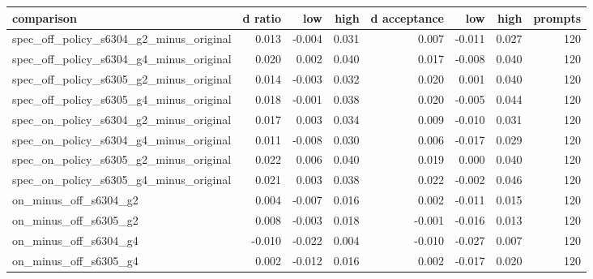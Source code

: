 \begin{tabular}{lrrrrrrr}
\toprule
comparison & d ratio & low & high & d acceptance & low & high & prompts \\
\midrule
spec\_off\_policy\_s6304\_g2\_minus\_original & 0.013 & -0.004 & 0.031 & 0.007 & -0.011 & 0.027 & 120 \\
spec\_off\_policy\_s6304\_g4\_minus\_original & 0.020 & 0.002 & 0.040 & 0.017 & -0.008 & 0.040 & 120 \\
spec\_off\_policy\_s6305\_g2\_minus\_original & 0.014 & -0.003 & 0.032 & 0.020 & 0.001 & 0.040 & 120 \\
spec\_off\_policy\_s6305\_g4\_minus\_original & 0.018 & -0.001 & 0.038 & 0.020 & -0.005 & 0.044 & 120 \\
spec\_on\_policy\_s6304\_g2\_minus\_original & 0.017 & 0.003 & 0.034 & 0.009 & -0.010 & 0.031 & 120 \\
spec\_on\_policy\_s6304\_g4\_minus\_original & 0.011 & -0.008 & 0.030 & 0.006 & -0.017 & 0.029 & 120 \\
spec\_on\_policy\_s6305\_g2\_minus\_original & 0.022 & 0.006 & 0.040 & 0.019 & 0.000 & 0.040 & 120 \\
spec\_on\_policy\_s6305\_g4\_minus\_original & 0.021 & 0.003 & 0.038 & 0.022 & -0.002 & 0.046 & 120 \\
on\_minus\_off\_s6304\_g2 & 0.004 & -0.007 & 0.016 & 0.002 & -0.011 & 0.015 & 120 \\
on\_minus\_off\_s6305\_g2 & 0.008 & -0.003 & 0.018 & -0.001 & -0.016 & 0.013 & 120 \\
on\_minus\_off\_s6304\_g4 & -0.010 & -0.022 & 0.004 & -0.010 & -0.027 & 0.007 & 120 \\
on\_minus\_off\_s6305\_g4 & 0.002 & -0.012 & 0.016 & 0.002 & -0.017 & 0.020 & 120 \\
\bottomrule
\end{tabular}
